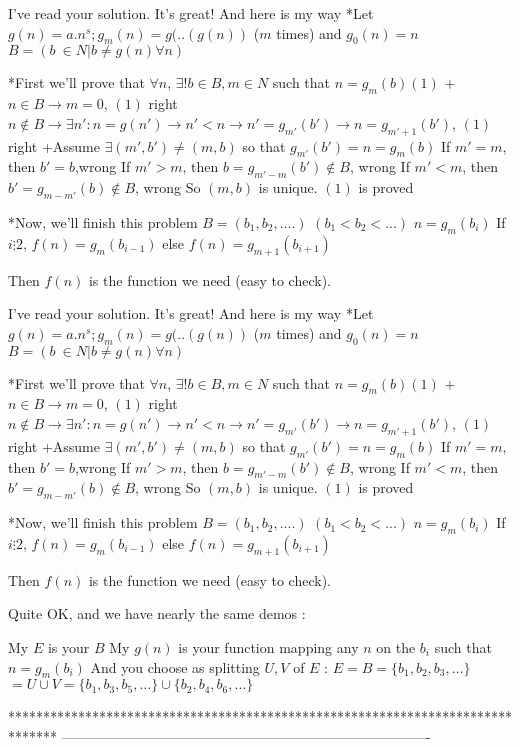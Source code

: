 \begin{mysolution}
	I've read your solution. It's great! And here is my way
*Let $ g(n)=a.n^{s}; g_{m}(n)=g(..(g(n))$ ($ m$ times) and $ g_{0}(n)=n$
$ B=(b\ \in N|b \neq g(n) \forall n)$

*First we'll prove that $ \forall n$, $ \exists ! b \in B,m \in N$ such that $ n=g_{m}(b) (1)$
+$ n \in B \rightarrow m=0$, $ (1)$ right
  $ n \notin B \rightarrow \exists n' : n=g(n') \rightarrow n'<n \rightarrow n'=g_{m'}(b') \rightarrow n=g_{m'+1}(b')$, $ (1)$ right
+Assume $ \exists (m',b') \neq (m,b)$ so that $ g_{m'}(b')=n=g_{m}(b)$
If $ m'=m$, then $ b'=b$,wrong
If $ m'>m$, then $ b=g_{m'-m}(b') \notin B$, wrong
If $ m'<m$, then $ b'=g_{m-m'}(b) \notin B$, wrong
So $ (m,b)$ is unique. $ (1)$ is proved

*Now, we'll finish this problem
$ B=(b_{1},b_{2},....)$ $ (b_{1}<b_{2}<...)$
$ n=g_{m}(b_{i})$ 
If $ i \vdots 2$, $ f(n)=g_{m}(b_{i-1})$
else $ f(n)=g_{m+1}(b_{i+1})$

Then $ f(n)$ is the function we need (easy to check).
\end{mysolution}



\begin{mysolution}
	\begin{tcolorbox}I've read your solution. It's great! And here is my way
*Let $ g(n) = a.n^{s}; g_{m}(n) = g(..(g(n))$ ($ m$ times) and $ g_{0}(n) = n$
$ B = (b\ \in N|b \neq g(n) \forall n)$

*First we'll prove that $ \forall n$, $ \exists ! b \in B,m \in N$ such that $ n = g_{m}(b) (1)$
+$ n \in B \rightarrow m = 0$, $ (1)$ right
  $ n \notin B \rightarrow \exists n' : n = g(n') \rightarrow n' < n \rightarrow n' = g_{m'}(b') \rightarrow n = g_{m' + 1}(b')$, $ (1)$ right
+Assume $ \exists (m',b') \neq (m,b)$ so that $ g_{m'}(b') = n = g_{m}(b)$
If $ m' = m$, then $ b' = b$,wrong
If $ m' > m$, then $ b = g_{m' - m}(b') \notin B$, wrong
If $ m' < m$, then $ b' = g_{m - m'}(b) \notin B$, wrong
So $ (m,b)$ is unique. $ (1)$ is proved

*Now, we'll finish this problem
$ B = (b_{1},b_{2},....)$ $ (b_{1} < b_{2} < ...)$
$ n = g_{m}(b_{i})$ 
If $ i \vdots 2$, $ f(n) = g_{m}(b_{i - 1})$
else $ f(n) = g_{m + 1}(b_{i + 1})$

Then $ f(n)$ is the function we need (easy to check).\end{tcolorbox}

Quite OK, and we have nearly the same demos :

My $ E$ is your $ B$
My $ g(n)$ is your function mapping any $ n$ on the $ b_i$ such that $ n=g_m(b_i)$
And you choose as splitting $ U,V$ of $ E$ :
$ E=B=\{b_1,b_2,b_3,\ldots\}$ $ = U\cup V=\{b_1,b_3,b_5,\ldots\}\cup\{b_2,b_4,b_6,\ldots\}$
\end{mysolution}
*******************************************************************************
-------------------------------------------------------------------------------

